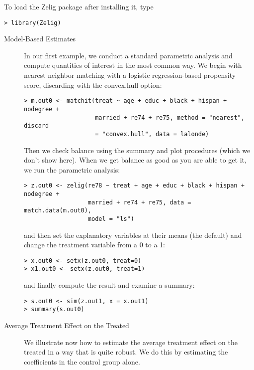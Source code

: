 To load the Zelig package after installing it, type
\begin{verbatim}
> library(Zelig)
\end{verbatim}

\begin{description}
\item[Model-Based Estimates] In our first example, we conduct a
  standard parametric analysis and compute quantities of interest in
  the most common way.  We begin with nearest neighbor matching with a
  logistic regression-based propensity score, discarding with the
  convex.hull \citep{KinZen06,KinZen07} option:
\begin{verbatim}
> m.out0 <- matchit(treat ~ age + educ + black + hispan + nodegree + 
                    married + re74 + re75, method = "nearest", discard
                    = "convex.hull", data = lalonde)
\end{verbatim}
  Then we check balance using the summary and plot procedures (which
  we don't show here).  When we get balance as good as you are able to
  get it, we run the parametric analysis:
\begin{verbatim}
> z.out0 <- zelig(re78 ~ treat + age + educ + black + hispan + nodegree + 
                  married + re74 + re75, data = match.data(m.out0), 
                  model = "ls")
\end{verbatim}
  and then set the explanatory variables at their means (the default)
  and change the treatment variable from a 0 to a 1:
\begin{verbatim}
> x.out0 <- setx(z.out0, treat=0)
> x1.out0 <- setx(z.out0, treat=1)
\end{verbatim}
and finally compute the result and examine a summary:
\begin{verbatim}
> s.out0 <- sim(z.out1, x = x.out1)
> summary(s.out0)
\end{verbatim}

\item[Average Treatment Effect on the Treated] We illustrate now how
  to estimate the average treatment effect on the treated in a way
  that is quite robust.  We do this by estimating the coefficients in
  the control group alone.


\end{description}
